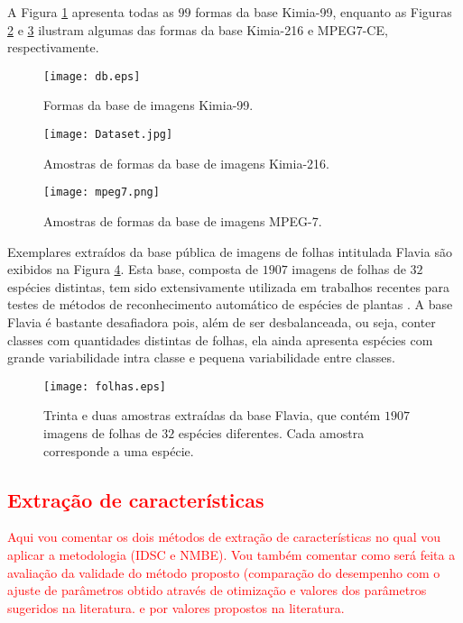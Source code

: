A Figura \ref{fig:db1} apresenta todas as $99$ formas da base Kimia-99, enquanto as Figuras \ref{fig:db2} e \ref{fig:db3} ilustram algumas das formas da base Kimia-216 e MPEG7-CE, respectivamente.

\begin{figure}[h!]
	\caption{\label{fig:db1} Formas da base de imagens Kimia-99.}
	\centering
	\texttt{[image: db.eps]}
\end{figure}

\begin{figure}[h!]
	\caption{\label{fig:db2} Amostras de formas da base de imagens Kimia-216.}
	\centering
	\texttt{[image: Dataset.jpg]}
\end{figure}

\begin{figure}[h!]
	\caption{\label{fig:db3} Amostras de formas da base de imagens MPEG-7.}
	\centering
	\texttt{[image: mpeg7.png]}
\end{figure}

Exemplares extraídos da base pública de imagens de folhas intitulada Flavia \cite{4458016} são exibidos na Figura \ref{fig:leaves}. Esta base, composta de  $1907$ imagens de folhas de $32$ espécies distintas, tem sido extensivamente utilizada em trabalhos recentes para testes de métodos de reconhecimento automático de espécies de plantas \cite{wang2015march,quteprints78723,Quadri:2015,Chaki201561}. A base Flavia é bastante desafiadora pois, além de ser desbalanceada, ou seja,  conter classes com quantidades distintas de folhas, ela ainda apresenta espécies com grande variabilidade intra classe e pequena variabilidade entre classes.

\begin{figure}[!ht]
	\caption{\label{fig:leaves} Trinta e duas amostras extraídas da base Flavia, que contém $1907$ imagens de folhas de $32$ espécies diferentes. Cada amostra corresponde a uma espécie.}
	\centering
	\texttt{[image: folhas.eps]}
\end{figure}

\textcolor{red}{
\section{Extração de características\label{sec:EA}}
Aqui vou comentar os dois métodos de extração de características no qual vou aplicar a metodologia (IDSC e NMBE).
Vou também comentar como será feita a avaliação da 
validade do método proposto (comparação do desempenho com o ajuste de parâmetros obtido através de otimização e valores dos parâmetros sugeridos na literatura.
e por valores propostos na literatura.
}

